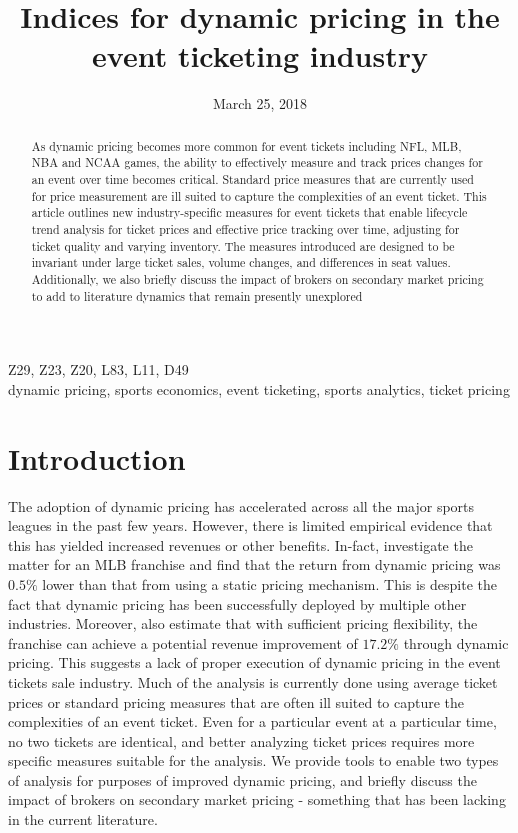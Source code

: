 \documentclass[letterpaper, 12pt]{article}
\begin{document}
\title{Indices for dynamic pricing in the event ticketing industry}
\date {March 25, 2018}
\maketitle
\begin{abstract} As dynamic pricing becomes more common for event tickets including NFL, MLB, NBA and NCAA games, the ability to effectively measure and track prices changes for an event over time becomes critical. Standard price measures that are currently used for price measurement are ill suited to capture the complexities of an event ticket. This article outlines new industry-specific measures for event tickets that enable lifecycle trend analysis for ticket prices and effective price tracking over time, adjusting for ticket quality and varying inventory. The measures introduced are designed to be invariant under large ticket sales, volume changes, and differences in seat values. Additionally, we also briefly discuss the impact of brokers on secondary market pricing to add to literature dynamics that remain presently unexplored
\end{abstract}
 Z29, Z23, Z20, L83, L11, D49 \\
 dynamic pricing, sports economics, event ticketing, sports analytics, ticket pricing

\section{Introduction}
The adoption of dynamic pricing has accelerated across all the major sports leagues in the past few years. However, there is limited empirical evidence that this has yielded increased revenues or other benefits.  In-fact, \cite{xu2017designing} investigate the matter for an MLB franchise and find that the return from dynamic pricing was $0.5\%$ lower than that from using a static pricing mechanism. This is despite the fact that dynamic pricing has been successfully deployed by multiple other industries. Moreover, \cite{xu2017designing} also estimate that with sufficient pricing flexibility, the franchise can achieve a potential revenue improvement of $17.2\%$ through dynamic pricing. This suggests a lack of proper execution of dynamic pricing in the event tickets sale industry. Much of the analysis is currently done using average ticket prices or standard pricing measures that are often ill suited to capture the complexities of an event ticket. Even for a particular event at a particular time, no two tickets are identical, and better analyzing ticket prices requires more specific measures suitable for the analysis. We provide tools to enable two types of analysis for purposes of improved dynamic pricing, and briefly discuss the impact of brokers on secondary market pricing - something that has been lacking in the current literature.
\end{document}
